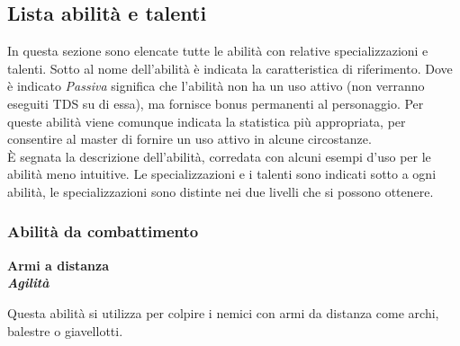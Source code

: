 \documentclass[../manuale_main.tex]{subfiles}
\begin{document}
\clearpage
\subsection{Lista abilità e talenti}

In questa sezione sono elencate tutte le abilità con relative specializzazioni e talenti.
Sotto al nome dell'abilità è indicata la caratteristica di riferimento. Dove è indicato \emph{Passiva} significa che l'abilità non ha un uso attivo (non verranno eseguiti TDS su di essa), ma fornisce bonus permanenti al personaggio. Per queste abilità viene comunque indicata la statistica più appropriata, per consentire al master di fornire un uso attivo in alcune circostanze.\\
È segnata la descrizione dell'abilità, corredata con alcuni esempi d'uso per le abilità meno intuitive.
Le specializzazioni e i talenti sono indicati sotto a ogni abilità, le specializzazioni sono distinte nei due livelli che si possono ottenere.


\subsubsection{Abilità da combattimento}


\renewcommand{\arraystretch}{1.2}

\begin{center}
\textbf{ \large{Armi a distanza}}\\ \textit{\textbf{Agilità}}\\
\end{center}

 Questa abilità si utilizza per colpire i nemici con armi da distanza come archi, balestre o giavellotti.    
\end{document}
